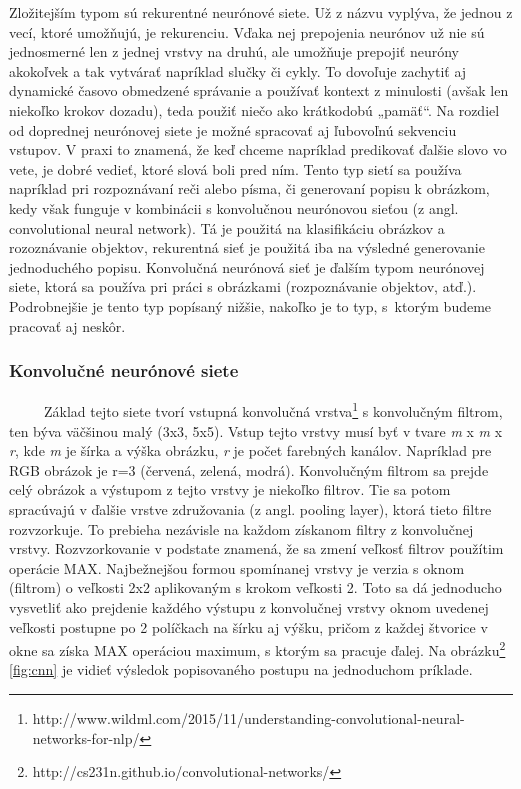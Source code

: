 	Zložitejším typom sú rekurentné neurónové siete. Už z názvu vyplýva, že jednou z vecí, ktoré umožňujú, je rekurenciu. Vďaka nej prepojenia neurónov už nie sú jednosmerné len z jednej vrstvy na druhú, ale umožňuje prepojiť neuróny akokoľvek a tak vytvárať napríklad slučky či cykly. To dovoľuje zachytiť aj dynamické časovo obmedzené správanie a používať kontext z minulosti (avšak len niekoľko krokov dozadu), teda použiť niečo ako krátkodobú „pamäť“. Na rozdiel od doprednej neurónovej siete je možné spracovať aj ľubovoľnú sekvenciu vstupov. V praxi to znamená, že keď chceme napríklad predikovať ďalšie slovo vo vete, je dobré vedieť, ktoré slová boli pred ním. Tento typ sietí sa používa napríklad pri rozpoznávaní reči\cite{rnn_speech} alebo písma\cite{rnn_handwriting}, či generovaní popisu k obrázkom\cite{image_description}, kedy však funguje v kombinácii s konvolučnou neurónovou sieťou (z angl. convolutional neural network). Tá je použitá na klasifikáciu obrázkov a rozoznávanie objektov, rekurentná sieť je použitá iba na výsledné generovanie jednoduchého popisu. 
	Konvolučná neurónová sieť je ďalším typom neurónovej siete, ktorá sa používa pri práci s obrázkami (rozpoznávanie objektov, atď.). Podrobnejšie je tento typ popísaný nižšie, nakoľko je to typ, s~ktorým budeme pracovať aj neskôr. 
	
	\subsubsection{Konvolučné neurónové siete}
	\
	\
	\
	\
	\
	Základ tejto siete tvorí vstupná konvolučná vrstva\footnote{http://www.wildml.com/2015/11/understanding-convolutional-neural-networks-for-nlp/} s konvolučným filtrom, ten býva väčšinou malý (3x3, 5x5). Vstup tejto vrstvy musí byť v tvare \textit{m} x \textit{m} x \textit{r}, kde \textit{m} je šírka a výška obrázku, \textit{r} je počet farebných kanálov. Napríklad pre RGB obrázok je r=3 (červená, zelená, modrá). Konvolučným filtrom sa prejde celý obrázok a výstupom z tejto vrstvy je niekoľko filtrov. Tie sa potom spracúvajú v ďalšie vrstve združovania (z angl. pooling layer\cite{cs231n}), ktorá tieto filtre rozvzorkuje. To prebieha nezávisle na každom získanom filtry z konvolučnej vrstvy. Rozvzorkovanie v podstate znamená, že sa zmení veľkosť filtrov použítim operácie MAX. Najbežnejšou formou spomínanej vrstvy je verzia s oknom (filtrom) o veľkosti 2x2 aplikovaným s krokom veľkosti 2. Toto sa dá jednoducho vysvetliť ako prejdenie každého výstupu z konvolučnej vrstvy oknom uvedenej veľkosti postupne po 2 políčkach na šírku aj výšku, pričom z každej štvorice v okne sa získa MAX operáciou maximum, s ktorým sa pracuje ďalej. Na  obrázku\footnote{http://cs231n.github.io/convolutional-networks/} \ref{fig:cnn} je vidieť výsledok popisovaného postupu na jednoduchom príklade.
	
